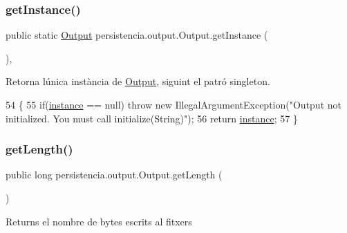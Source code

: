 \subsubsection{\texorpdfstring{get\+Instance()}{getInstance()}}
{\footnotesize\ttfamily public static \hyperlink{classpersistencia_1_1output_1_1Output}{Output} persistencia.\+output.\+Output.\+get\+Instance (\begin{DoxyParamCaption}{ }\end{DoxyParamCaption})\hspace{0.3cm}{\ttfamily [inline]}, {\ttfamily [static]}}



Retorna l\textquotesingle{}única instància de \hyperlink{classpersistencia_1_1output_1_1Output}{Output}, siguint el patró singleton. 


\begin{DoxyCode}
54                                        \{
55         \textcolor{keywordflow}{if}(\hyperlink{classpersistencia_1_1output_1_1Output_aaadf14a03c4f3f585170abdc7524b63d}{instance} == null) \textcolor{keywordflow}{throw} \textcolor{keyword}{new} IllegalArgumentException(\textcolor{stringliteral}{"Output not initialized. You must
       call initialize(String)"});
56         \textcolor{keywordflow}{return} \hyperlink{classpersistencia_1_1output_1_1Output_aaadf14a03c4f3f585170abdc7524b63d}{instance};
57     \}
\end{DoxyCode}
\mbox{\label{classpersistencia_1_1output_1_1Output_a646d510d52039785f485d42e675cdfee}} 
\subsubsection{\texorpdfstring{get\+Length()}{getLength()}}
{\footnotesize\ttfamily public long persistencia.\+output.\+Output.\+get\+Length (\begin{DoxyParamCaption}{ }\end{DoxyParamCaption})\hspace{0.3cm}{\ttfamily [inline]}}

\begin{DoxyReturn}{Returns}
el nombre de bytes escrits al fitxers 
\end{DoxyReturn}

